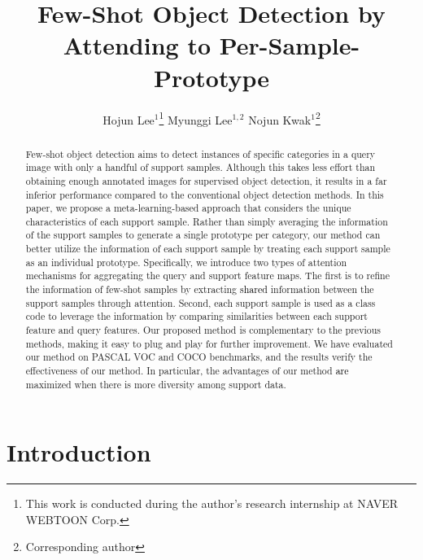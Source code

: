 \documentclass[10pt,twocolumn,letterpaper]{article}
\newcommand{\nj}[1]{\textcolor{black}{#1}}
\newcommand{\hj}[1]{\textcolor{black}{#1}}
\begin{document}
\title{Few-Shot Object Detection  by Attending to Per-Sample-Prototype}



\author[ ]{Hojun Lee$^1$\thanks{This work is conducted during the author’s research internship at NAVER WEBTOON Corp. \hspace{-0.5cm}} \:\: Myunggi Lee$^{1,2}$ \:\: Nojun Kwak$^1$\thanks{Corresponding author}}


\maketitle


\begin{abstract} \vspace{-0.2cm}
Few-shot object detection aims to detect instances of specific categories in a query image with only a handful of support samples. Although this takes less effort than obtaining enough annotated images for supervised object detection, it results in a far inferior performance compared to the conventional object detection methods. In this paper, we propose a meta-learning-based approach that considers the unique characteristics of each support sample. 
Rather than simply averaging the information of the support samples to generate a single prototype per category, our method can better utilize the information of each support sample by treating each support sample as an individual prototype.
Specifically, we introduce two types of attention mechanisms for aggregating the query and support feature maps. The first is to refine the information of few-shot samples by extracting \nj{shared} information between the support samples through attention. Second, each support sample is used as a class code to leverage the information by comparing similarities between each support feature and query features. Our proposed method is complementary to the previous methods, making it easy to plug and play for further improvement. We have evaluated our method on PASCAL VOC and COCO benchmarks, and the results verify the effectiveness of our method. In particular, the advantages of our method \hj{are} maximized when there is more diversity among support data.
\end{abstract}\vspace{-0.4cm}

\section{Introduction} \vspace{-0.05cm}
\end{document}
